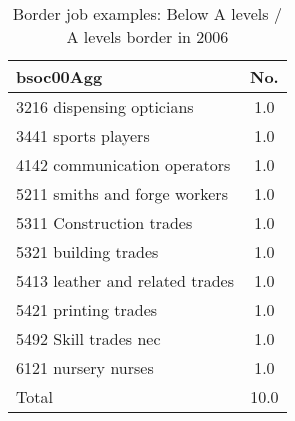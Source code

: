 \begin{table}[h!]
	\centering
	\caption{Border job examples: Below A levels / A levels border in 2006}
	\label{tab:360112mult}
	\begin{tabular}{lc}
	\toprule
bsoc00Agg&No. \\
\hline
3216 dispensing opticians&1.0 \\
3441 sports players&1.0 \\
4142 communication operators&1.0 \\
5211 smiths and forge workers&1.0 \\
5311 Construction trades&1.0 \\
5321 building trades&1.0 \\
5413 leather and related trades&1.0 \\
5421 printing trades&1.0 \\
5492 Skill trades nec&1.0 \\
6121 nursery nurses&1.0 \\
Total&10.0 \\
\bottomrule
\bottomrule
\end{tabular}
\end{table}
